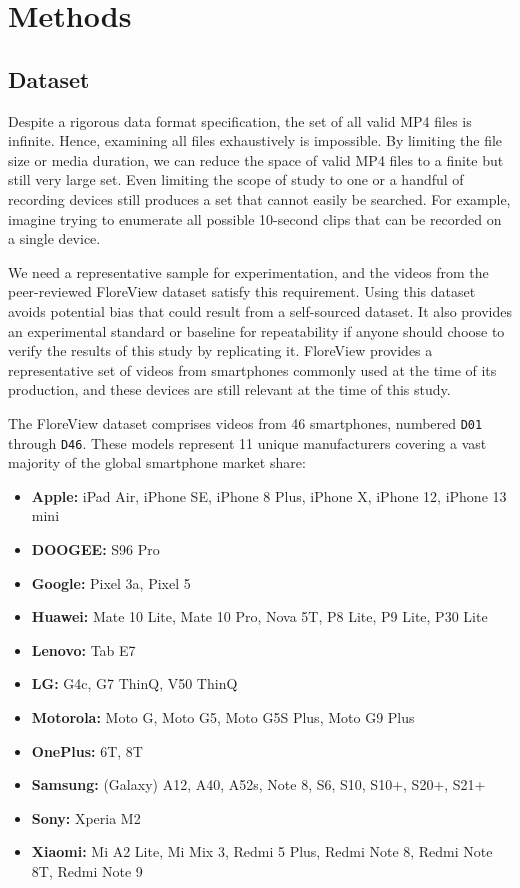 \chapter{Methods}
\label{cha:methods}

\section{Dataset}

Despite a rigorous data format specification, the set of all valid MP4 files is infinite. Hence, examining all files exhaustively is impossible. By limiting the file size or media duration, we can reduce the space of valid MP4 files to a finite but still very large set. Even limiting the scope of study to one or a handful of recording devices still produces a set that cannot easily be searched. For example, imagine trying to enumerate all possible 10-second clips that can be recorded on a single device.

We need a representative sample for experimentation, and the videos from the peer-reviewed FloreView dataset \cite{baracchi2023} satisfy this requirement. Using this dataset avoids potential bias that could result from a self-sourced dataset. It also provides an experimental standard or baseline for repeatability if anyone should choose to verify the results of this study by replicating it. FloreView provides a representative set of videos from smartphones commonly used at the time of its production, and these devices are still relevant at the time of this study.

The FloreView dataset comprises videos from 46 smartphones, numbered \texttt{D01} through \texttt{D46}. These models represent 11 unique manufacturers covering a vast majority of the global smartphone market share:

\begin{itemize}
    \item \textbf{Apple:} iPad Air, iPhone SE, iPhone 8 Plus, iPhone X, iPhone 12, iPhone 13 mini
    \item \textbf{DOOGEE:} S96 Pro
    \item \textbf{Google:} Pixel 3a, Pixel 5
    \item \textbf{Huawei:} Mate 10 Lite, Mate 10 Pro, Nova 5T, P8 Lite, P9 Lite, P30 Lite
    \item \textbf{Lenovo:} Tab E7
    \item \textbf{LG:} G4c, G7 ThinQ, V50 ThinQ
    \item \textbf{Motorola:} Moto G, Moto G5, Moto G5S Plus, Moto G9 Plus
    \item \textbf{OnePlus:} 6T, 8T
    \item \textbf{Samsung:} (Galaxy) A12, A40, A52s, Note 8, S6, S10, S10+, S20+, S21+
    \item \textbf{Sony:} Xperia M2
    \item \textbf{Xiaomi:} Mi A2 Lite, Mi Mix 3, Redmi 5 Plus, Redmi Note 8, Redmi Note 8T, Redmi Note 9
\end{itemize}

